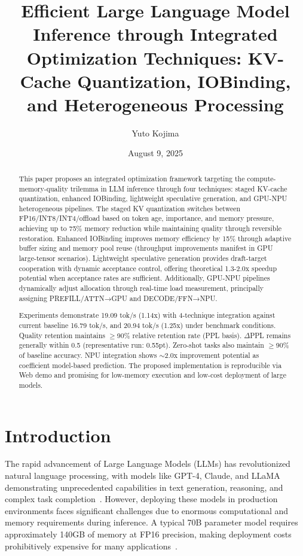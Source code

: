 \documentclass[twocolumn,10pt]{article}
\title{Efficient Large Language Model Inference through Integrated Optimization Techniques: KV-Cache Quantization, IOBinding, and Heterogeneous Processing}
\author{Yuto Kojima}
\date{August 9, 2025}
\begin{document}
\maketitle

\begin{abstract}
This paper proposes an integrated optimization framework targeting the compute-memory-quality trilemma in LLM inference through four techniques: staged KV-cache quantization, enhanced IOBinding, lightweight speculative generation, and GPU-NPU heterogeneous pipelines. The staged KV quantization switches between FP16/INT8/INT4/offload based on token age, importance, and memory pressure, achieving up to 75\% memory reduction while maintaining quality through reversible restoration. Enhanced IOBinding improves memory efficiency by 15\% through adaptive buffer sizing and memory pool reuse (throughput improvements manifest in GPU large-tensor scenarios). Lightweight speculative generation provides draft-target cooperation with dynamic acceptance control, offering theoretical 1.3-2.0x speedup potential when acceptance rates are sufficient. Additionally, GPU-NPU pipelines dynamically adjust allocation through real-time load measurement, principally assigning PREFILL/ATTN→GPU and DECODE/FFN→NPU.

Experiments demonstrate 19.09 tok/s (1.14x) with 4-technique integration against current baseline 16.79 tok/s, and 20.94 tok/s (1.25x) under benchmark conditions. Quality retention maintains $\geq$90\% relative retention rate (PPL basis). $\Delta$PPL remains generally within 0.5 (representative run: 0.55pt). Zero-shot tasks also maintain $\geq$90\% of baseline accuracy. NPU integration shows $\sim$2.0x improvement potential as coefficient model-based prediction. The proposed implementation is reproducible via Web demo and promising for low-memory execution and low-cost deployment of large models.
\end{abstract}

\section{Introduction}

The rapid advancement of Large Language Models (LLMs) has revolutionized natural language processing, with models like GPT-4, Claude, and LLaMA demonstrating unprecedented capabilities in text generation, reasoning, and complex task completion~\cite{brown2020language}. However, deploying these models in production environments faces significant challenges due to enormous computational and memory requirements during inference. A typical 70B parameter model requires approximately 140GB of memory at FP16 precision, making deployment costs prohibitively expensive for many applications~\cite{touvron2023llama}.
\end{document}
